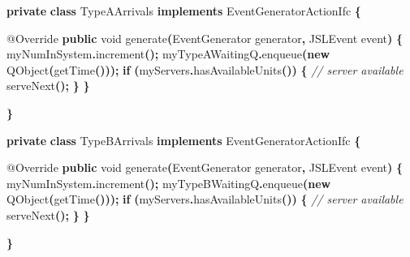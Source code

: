 \documentclass[
]{book}
\newenvironment{Shaded}{\begin{snugshade}}{\end{snugshade}}
\newcommand{\AttributeTok}[1]{\textcolor[rgb]{0.77,0.63,0.00}{#1}}
\newcommand{\CommentTok}[1]{\textcolor[rgb]{0.56,0.35,0.01}{\textit{#1}}}
\newcommand{\ControlFlowTok}[1]{\textcolor[rgb]{0.13,0.29,0.53}{\textbf{#1}}}
\newcommand{\DataTypeTok}[1]{\textcolor[rgb]{0.13,0.29,0.53}{#1}}
\newcommand{\FunctionTok}[1]{\textcolor[rgb]{0.00,0.00,0.00}{#1}}
\newcommand{\KeywordTok}[1]{\textcolor[rgb]{0.13,0.29,0.53}{\textbf{#1}}}
\newcommand{\NormalTok}[1]{#1}
\newcommand{\OperatorTok}[1]{\textcolor[rgb]{0.81,0.36,0.00}{\textbf{#1}}}
\theoremstyle{definition}
\theoremstyle{definition}
\theoremstyle{definition}
\theoremstyle{definition}
\theoremstyle{remark}
\begin{document}
\begin{Shaded}
\begin{Highlighting}[]
    \KeywordTok{private} \KeywordTok{class}\NormalTok{ TypeAArrivals }\KeywordTok{implements}\NormalTok{ EventGeneratorActionIfc }\OperatorTok{\{}

        \AttributeTok{@Override}
        \KeywordTok{public} \DataTypeTok{void} \FunctionTok{generate}\OperatorTok{(}\NormalTok{EventGenerator generator}\OperatorTok{,}\NormalTok{ JSLEvent event}\OperatorTok{)} \OperatorTok{\{}
\NormalTok{            myNumInSystem}\OperatorTok{.}\FunctionTok{increment}\OperatorTok{();}
\NormalTok{            myTypeAWaitingQ}\OperatorTok{.}\FunctionTok{enqueue}\OperatorTok{(}\KeywordTok{new} \FunctionTok{QObject}\OperatorTok{(}\FunctionTok{getTime}\OperatorTok{()));}
            \ControlFlowTok{if} \OperatorTok{(}\NormalTok{myServers}\OperatorTok{.}\FunctionTok{hasAvailableUnits}\OperatorTok{())} \OperatorTok{\{} \CommentTok{// server available}
                \FunctionTok{serveNext}\OperatorTok{();}
            \OperatorTok{\}}
        \OperatorTok{\}}

    \OperatorTok{\}}

    \KeywordTok{private} \KeywordTok{class}\NormalTok{ TypeBArrivals }\KeywordTok{implements}\NormalTok{ EventGeneratorActionIfc }\OperatorTok{\{}

        \AttributeTok{@Override}
        \KeywordTok{public} \DataTypeTok{void} \FunctionTok{generate}\OperatorTok{(}\NormalTok{EventGenerator generator}\OperatorTok{,}\NormalTok{ JSLEvent event}\OperatorTok{)} \OperatorTok{\{}
\NormalTok{            myNumInSystem}\OperatorTok{.}\FunctionTok{increment}\OperatorTok{();}
\NormalTok{            myTypeBWaitingQ}\OperatorTok{.}\FunctionTok{enqueue}\OperatorTok{(}\KeywordTok{new} \FunctionTok{QObject}\OperatorTok{(}\FunctionTok{getTime}\OperatorTok{()));}
            \ControlFlowTok{if} \OperatorTok{(}\NormalTok{myServers}\OperatorTok{.}\FunctionTok{hasAvailableUnits}\OperatorTok{())} \OperatorTok{\{} \CommentTok{// server available}
                \FunctionTok{serveNext}\OperatorTok{();}
            \OperatorTok{\}}
        \OperatorTok{\}}

    \OperatorTok{\}}


\end{Highlighting}
\end{Shaded}
\end{document}
